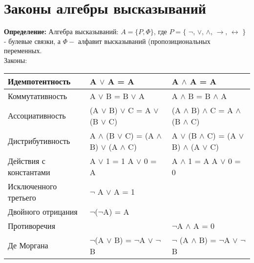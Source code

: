 \documentclass[../main.tex]{subfiles}
\begin{document}
\section{Законы алгебры высказываний}
\textbf{Определение:
}Алгебра высказываний: $A = \{P, \varPhi \}$, где $P = \{$ $\lnot$, $\lor$, $\land$, $\rightarrow$, $\leftrightarrow$ $\}$ - булевые связки, а $\varPhi -$ алфавит высказываний (пропозициональных переменных.\\
Законы:
\begin{center}
    \begin{tabular}{| m{10em} | m{10em} | m{10em}|} 
        \hline
        Идемпотентность & A $\lor$ A = A & A $\land$ A = A\\ 
        \hline
        Коммутативность & A $\lor$ B = B $\lor$ A &  A $\land$ B = B $\land$ A\\ 
        \hline
		Ассоциативность & (A $\lor$ B) $\lor$ C = A $\lor$ (B $\lor$ C) & (A $\land$ B) $\land$ C = A $\land$ (B $\land$ C) \\ 
        \hline
        Дистрибутивность &  A $\land$ (B $\lor$ C) = (A $\land$ B) $\lor$ (A $\land$ C) & A $\lor$ (B $\land$ C) = (A $\lor$ B) $\land$ (A $\lor$ C)\\ 
        \hline
        Действия с константами & A $\lor$ 1 = 1  A $\lor$ 0 = A & A $\land$ 1 = A  A $\lor$ 0 = 0\\
        \hline
		Исключенного третьего & $\lnot$ A $\lor$ A = 1 & \\
        \hline
        Двойного отрицания & $\lnot$($\lnot$A) = A & \\
        \hline
        Противоречия & & $\lnot$A $\land$ A = 0\\
        \hline
		Де Моргана & $\lnot$(A $\lor$ B) = $\lnot$A $\lor$ $\lnot$ B & $\lnot$ (A $\land$ B) = $\lnot$A $\lor$ $\lnot$B\\
        \hline
    \end{tabular}
\end{center}


\end{document}
